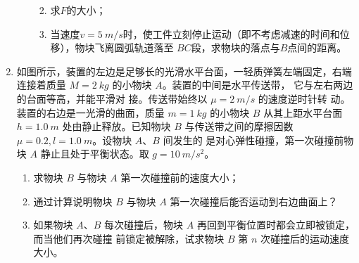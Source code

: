 \begin{enumerate}
\begin{enumerate}
\begin{enumerate}
\renewcommand{\labelenumiii}{\alph{enumiii}.}
\item
求$ F $的大小；

\item 
当速度$ v=5 \ m/s $时，使工件立刻停止运动（即不考虑减速的时间和位移），物块飞离圆弧轨道落至
$ BC $段，求物块的落点与$ B $点间的距离。




\end{enumerate}





\end{enumerate}
\begin{figure}[h!]
\flushright

\end{figure}



\newpage
\item 
{}
如图所示，装置的左边是足够长的光滑水平台面，一轻质弹簧左端固定，右端连接着质量 $ M=2 \ kg $
的小物块 $ A $。装置的中间是水平传送带，
它与左右两边的台面等高，并能平滑对
接。传送带始终以 $ \mu=2 \ m/s $ 的速度逆时针转
动。装置的右边是一光滑的曲面，质量
$ m=1 \ kg $ 的小物块 $ B $ 从其上距水平台面
$ h=1.0 \ m $ 处由静止释放。已知物块 $ B $ 与传送带之间的摩擦因数$ \mu =0.2,l=1.0 \ m $。设物块 $ A $、$ B $ 间发生的
是对心弹性碰撞，第一次碰撞前物块 $ A $ 静止且处于平衡状态。取 $ g=10 \ m/s^{2} $。
\begin{enumerate}
\renewcommand{\labelenumi}{\arabic{enumi}.}
\item
求物块 $ B $ 与物块 $ A $ 第一次碰撞前的速度大小；
\item 
通过计算说明物块 $ B $ 与物块 $ A $ 第一次碰撞后能否运动到右边曲面上？
\item 
如果物块 $ A $、$ B $ 每次碰撞后，物块 $ A $ 再回到平衡位置时都会立即被锁定，而当他们再次碰撞
前锁定被解除，试求物块 $ B $ 第 $ n $ 次碰撞后的运动速度大小。




\end{enumerate}
\end{enumerate}

